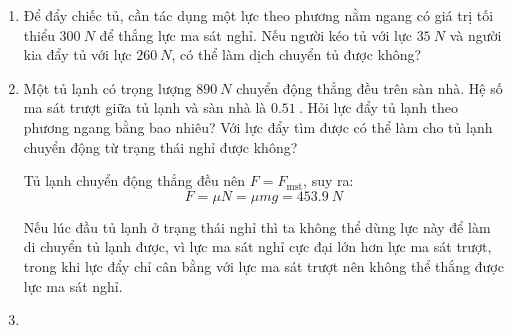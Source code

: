 \begin{enumerate}[label=\bfseries Bài \arabic*:]
	\item {}
	
	{
		Để đẩy chiếc tủ, cần tác dụng một lực theo phương nằm ngang có giá trị tối thiểu $\SI{300}{N}$ để thắng lực ma sát nghỉ. Nếu người kéo tủ với lực $\SI{35}{N}$ và người kia đẩy tủ với lực $\SI{260}{N}$, có thể làm dịch chuyển tủ được không?
	}
	
	
	\item {}
	
	
	{Một tủ lạnh có trọng lượng $\SI{890}{N}$ chuyển động thẳng đều trên sàn nhà. Hệ số ma sát trượt giữa tủ lạnh và sàn nhà là $\SI{0.51}{}$. Hỏi lực đẩy tủ lạnh theo phương ngang bằng bao nhiêu? Với lực đẩy tìm được có thể làm cho tủ lạnh chuyển động từ trạng thái nghỉ được không?
		
	}
	
	\hideall
	{Tủ lạnh chuyển động thẳng đều nên $F=F_\text{mst}$, suy ra:
		$$F=\mu N = \mu mg = \SI{453.9}{N}$$
		
		Nếu lúc đầu tủ lạnh ở trạng thái nghỉ thì ta không thể dùng lực này để làm di chuyển tủ lạnh được, vì lực ma sát nghỉ cực đại lớn hơn lực ma sát trượt, trong khi lực đẩy chỉ cân bằng với lực ma sát trượt nên không thể thắng được lực ma sát nghỉ.
	}
	\item {}
	

\end{enumerate}
